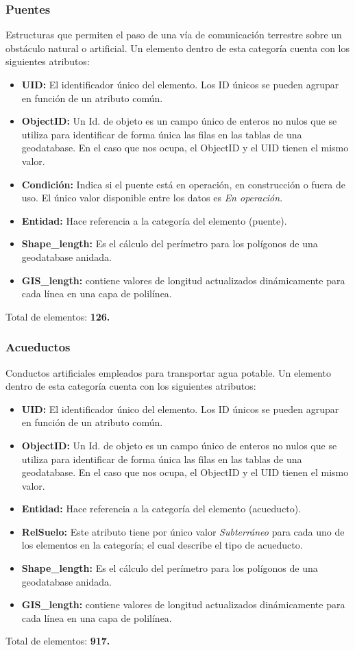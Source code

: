 \documentclass[10pt,letterpaper]{article}
\newcommand{\descripcion}{Un elemento dentro de esta categoría cuenta con los siguientes atributos:}
\newcommand{\total}{Total de elementos: }
\newcommand{\UID}{\textbf{UID:} El identificador único del elemento. Los ID únicos se pueden agrupar en función de un atributo común.}
\newcommand{\OID}{\textbf{ObjectID:} Un Id. de objeto es un campo único de enteros no nulos que se utiliza para identificar de forma única las filas en las tablas de una geodatabase. En el caso que nos ocupa, el ObjectID y el UID tienen el mismo valor.}
\newcommand{\ent}{\textbf{Entidad:} Hace referencia a la categoría del elemento }
\newcommand{\SHL}{\textbf{Shape\_length:} Es el cálculo del perímetro para los polígonos de una geodatabase anidada.}
\newcommand{\GISL}{\textbf{GIS\_length:} contiene valores de longitud actualizados dinámicamente para cada línea en una capa de polilínea.}
\begin{document}
\subsubsection{Puentes}
Estructuras que permiten el paso de una vía de comunicación terrestre sobre un obstáculo natural o artificial. \descripcion
\begin{itemize}
	\item \UID
	\item \OID
	\item \textbf{Condición:} Indica si el puente está en operación, en construcción o fuera de uso. El único valor disponible entre los datos es \emph{En operación}.
	\item \ent (puente).
	\item \SHL
	\item \GISL
\end{itemize}
\total \textbf{126.}

\subsubsection{Acueductos}
Conductos artificiales empleados para transportar agua potable. \descripcion
\begin{itemize}
	\item \UID
	\item \OID
	\item \ent (acueducto).
	\item \textbf{RelSuelo:} Este atributo tiene por único valor \emph{Subterráneo} para cada uno de los elementos en la categoría; el cual describe el tipo de acueducto.
	\item \SHL
	\item \GISL
\end{itemize}
\total \textbf{917.}
\end{document}
